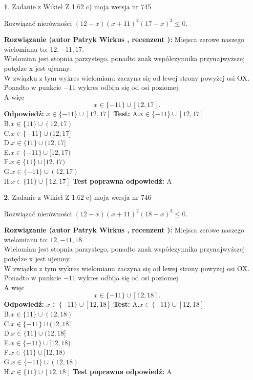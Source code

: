 \documentclass[12pt, a4paper]{article}
\theoremstyle{definition} %
\newtheorem{zad}{}
\newcommand{\zadStart}[1]{\begin{zad}#1\newline}
\newcommand{\zadStop}{\end{zad}}
\newcommand{\rozwStart}[2]{\noindent \textbf{Rozwiązanie (autor #1 , recenzent #2): }\newline}
\newcommand{\rozwStop}{\newline}
\newcommand{\odpStart}{\noindent \textbf{Odpowiedź:}\newline}
\newcommand{\odpStop}{\newline}
\newcommand{\testStart}{\noindent \textbf{Test:}\newline}
\newcommand{\testStop}{\newline}
\newcommand{\kluczStart}{\noindent \textbf{Test poprawna odpowiedź:}\newline}
\newcommand{\kluczStop}{\newline}
\begin{document}
\zadStart{Zadanie z Wikieł Z 1.62 c) moja wersja nr 745}

Rozwiązać nierówności $(12-x)(x+11)^{2}(17-x)^{3}\le0$.
\zadStop
\rozwStart{Patryk Wirkus}{}
Miejsca zerowe naszego wielomianu to: $12, -11, 17$.\\
Wielomian jest stopnia parzystego, ponadto znak współczynnika przy\linebreak najwyższej potędze x jest ujemny.\\ W związku z tym wykres wielomianu zaczyna się od lewej strony powyżej osi OX.\\
Ponadto w punkcie $-11$ wykres odbija się od osi poziomej.\\
A więc $$x \in \{-11\} \cup [12,17].$$
\rozwStop
\odpStart
$x \in \{-11\} \cup [12,17]$
\odpStop
\testStart
A.$x \in \{-11\} \cup [12,17]$\\
B.$x \in \{11\} \cup (12,17)$\\
C.$x \in \{-11\} \cup (12,17]$\\
D.$x \in \{11\} \cup (12,17]$\\
E.$x \in \{-11\} \cup [12,17)$\\
F.$x \in \{11\} \cup [12,17)$\\
G.$x \in \{-11\} \cup (12,17)$\\
H.$x \in \{11\} \cup [12,17]$
\testStop
\kluczStart
A
\kluczStop



\zadStart{Zadanie z Wikieł Z 1.62 c) moja wersja nr 746}

Rozwiązać nierówności $(12-x)(x+11)^{2}(18-x)^{3}\le0$.
\zadStop
\rozwStart{Patryk Wirkus}{}
Miejsca zerowe naszego wielomianu to: $12, -11, 18$.\\
Wielomian jest stopnia parzystego, ponadto znak współczynnika przy\linebreak najwyższej potędze x jest ujemny.\\ W związku z tym wykres wielomianu zaczyna się od lewej strony powyżej osi OX.\\
Ponadto w punkcie $-11$ wykres odbija się od osi poziomej.\\
A więc $$x \in \{-11\} \cup [12,18].$$
\rozwStop
\odpStart
$x \in \{-11\} \cup [12,18]$
\odpStop
\testStart
A.$x \in \{-11\} \cup [12,18]$\\
B.$x \in \{11\} \cup (12,18)$\\
C.$x \in \{-11\} \cup (12,18]$\\
D.$x \in \{11\} \cup (12,18]$\\
E.$x \in \{-11\} \cup [12,18)$\\
F.$x \in \{11\} \cup [12,18)$\\
G.$x \in \{-11\} \cup (12,18)$\\
H.$x \in \{11\} \cup [12,18]$
\testStop
\kluczStart
A
\kluczStop
\end{document}
